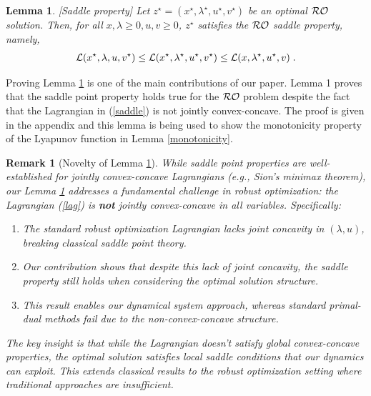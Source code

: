 \documentclass[journal,twoside,web]{ieeecolor}
\newtheorem{lemma}{Lemma}
\newtheorem{remark}{Remark}
\begin{document}
\begin{lemma} \label{saddle.lem} [Saddle property]
Let $z^\star=(x^\star,\lambda^\star,u^\star,v^\star)$ be an optimal ${\cal RO}$ solution. Then, for all $x,\lambda\geq 0,u,v\geq 0$\;, $z^\star$ satisfies the ${\cal RO}$ saddle property, namely,
\begin{align} \label{saddle}
{\cal L}(x^\star,\lambda,u,v^\star)\leq {\cal L}(x^\star,\lambda^\star,u^\star,v^\star)\leq {\cal L}(x,\lambda^\star,u^\star,v)\;.
\end{align}
\end{lemma}

Proving Lemma \ref{saddle.lem} is one of the main contributions of our paper. Lemma 1 proves that the saddle point property holds true for the ${\cal RO}$ problem despite the fact that the Lagrangian in (\ref{saddle}) is not jointly convex-concave. The proof is given in the appendix and this lemma is being used to show the monotonicity property of the Lyapunov function in Lemma \ref{monotonicity}.

{\color{blue} \begin{remark}[Novelty of Lemma \ref{saddle.lem}]
While saddle point properties are well-established for jointly convex-concave Lagrangians (e.g., Sion's minimax theorem), our Lemma \ref{saddle.lem} addresses a fundamental challenge in robust optimization: the Lagrangian (\ref{lag}) is \textbf{not} jointly convex-concave in all variables. Specifically:

\begin{enumerate}
\item The standard robust optimization Lagrangian lacks joint concavity in $(\lambda, u)$, breaking classical saddle point theory.
\item Our contribution shows that despite this lack of joint concavity, the saddle property still holds when considering the optimal solution structure.
\item This result enables our dynamical system approach, whereas standard primal-dual methods fail due to the non-convex-concave structure.
\end{enumerate}

The key insight is that while the Lagrangian doesn't satisfy global convex-concave properties, the optimal solution satisfies local saddle conditions that our dynamics can exploit. This extends classical results to the robust optimization setting where traditional approaches are insufficient.
\end{remark}}
\end{document}
